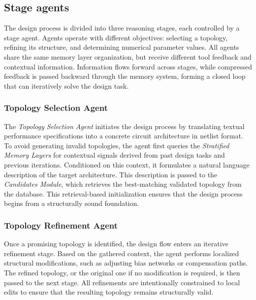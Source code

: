 \documentclass[sigconf,nonacm]{acmart}
\begin{document}
\subsection{Stage agents}




The design process is divided into three reasoning stages, each controlled by a stage agent. Agents operate with different objectives: selecting a topology, refining its structure, and determining numerical parameter values. All agents share the same memory layer organization, but receive different tool feedback and contextual information. Information flows forward across stages, while compressed feedback is passed backward through the memory system, forming a closed loop that can iteratively solve the design task.


\subsubsection{Topology Selection Agent}




The \emph{Topology Selection Agent} initiates the design process by translating textual performance specifications into a concrete circuit architecture in netlist format. To avoid generating invalid topologies, the agent first queries the \emph{Stratified Memory Layers} for contextual signals derived from past design tasks and previous iterations. Conditioned on this context, it formulates a natural language description of the target architecture. This description is passed to the \emph{Candidates Module}, which retrieves the best-matching validated topology from the database. This retrieval-based initialization ensures that the design process begins from a structurally sound foundation.


\subsubsection{Topology Refinement Agent}


Once a promising topology is identified, the design flow enters an iterative refinement stage. Based on the gathered context, the agent performs localized structural modifications, such as adjusting bias networks or compensation paths. The refined topology, or the original one if no modification is required, is then passed to the next stage. All refinements are intentionally constrained to local edits to ensure that the resulting topology remains structurally valid.
\end{document}
